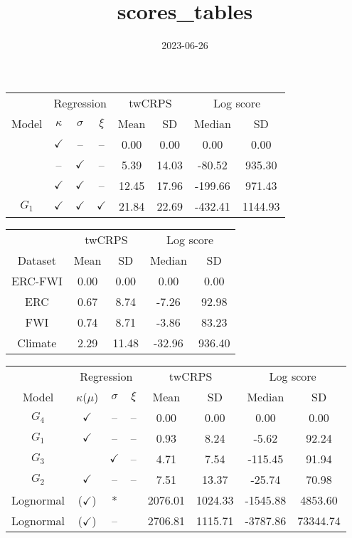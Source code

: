 \documentclass[
]{article}
\title{scores\_tables}
\author{}
\date{\vspace{-2.5em}2023-06-26}
\begin{document}
\maketitle

\begin{tabular}{cccccccc}
\toprule
\multicolumn{1}{c}{ } & \multicolumn{3}{c}{Regression} & \multicolumn{2}{c}{twCRPS} & \multicolumn{2}{c}{Log score} \\
\cmidrule(l{3pt}r{3pt}){2-4} \cmidrule(l{3pt}r{3pt}){5-6} \cmidrule(l{3pt}r{3pt}){7-8}
Model & $\kappa$ & $\sigma$ & $\xi$ & Mean & SD  & Median & SD\\
\midrule
 & $\checkmark$ & -- & -- & 0.00 & 0.00 & 0.00 & 0.00\\

 & -- & $\checkmark$ & -- & 5.39 & 14.03 & -80.52 & 935.30\\

 & $\checkmark$ & $\checkmark$ & -- & 12.45 & 17.96 & -199.66 & 971.43\\

\multirow{-4}{*}{\centering\arraybackslash $G_1$} & $\checkmark$ & $\checkmark$ & $\checkmark$ & 21.84 & 22.69 & -432.41 & 1144.93\\
\bottomrule
\end{tabular}

\begin{tabular}{ccccc}
\toprule
\multicolumn{1}{c}{ } & \multicolumn{2}{c}{twCRPS} & \multicolumn{2}{c}{Log score} \\
\cmidrule(l{3pt}r{3pt}){2-3} \cmidrule(l{3pt}r{3pt}){4-5}
Dataset & Mean & SD  & Median & SD\\
\midrule
ERC-FWI & 0.00 & 0.00 & 0.00 & 0.00\\
ERC & 0.67 & 8.74 & -7.26 & 92.98\\
FWI & 0.74 & 8.71 & -3.86 & 83.23\\
Climate & 2.29 & 11.48 & -32.96 & 936.40\\
\bottomrule
\end{tabular}

\begin{tabular}{cccccccc}
\toprule
\multicolumn{1}{c}{ } & \multicolumn{3}{c}{Regression} & \multicolumn{2}{c}{twCRPS} & \multicolumn{2}{c}{Log score} \\
\cmidrule(l{3pt}r{3pt}){2-4} \cmidrule(l{3pt}r{3pt}){5-6} \cmidrule(l{3pt}r{3pt}){7-8}
Model & $\kappa$($\mu$) & $\sigma$ & $\xi$ & Mean & SD  & Median & SD\\
\midrule
$G_4$ & $\checkmark$ & -- & -- & 0.00 & 0.00 & 0.00 & 0.00\\
$G_1$ & $\checkmark$ & -- & -- & 0.93 & 8.24 & -5.62 & 92.24\\
$G_3$ &  & $\checkmark$ & -- & 4.71 & 7.54 & -115.45 & 91.94\\
$G_2$ & $\checkmark$ & -- & -- & 7.51 & 13.37 & -25.74 & 70.98\\
Lognormal & ($\checkmark$) & * &  & 2076.01 & 1024.33 & -1545.88 & 4853.60\\
\addlinespace
Lognormal & ($\checkmark$) & -- &  & 2706.81 & 1115.71 & -3787.86 & 73344.74\\
\bottomrule
\end{tabular}
\end{document}
